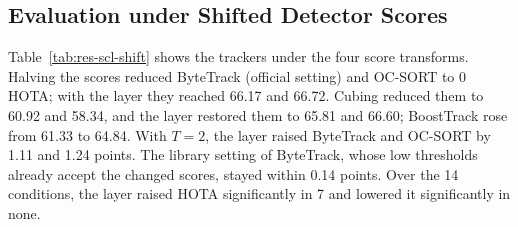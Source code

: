 \subsection{Evaluation under Shifted Detector Scores}\label{sec:res-shift}
Table~\ref{tab:res-scl-shift} shows the trackers under the four score transforms. Halving the scores reduced ByteTrack (official setting) and OC-SORT to 0 HOTA; with the layer they reached 66.17 and 66.72. Cubing reduced them to 60.92 and 58.34, and the layer restored them to 65.81 and 66.60; BoostTrack rose from 61.33 to 64.84. With $T=2$, the layer raised ByteTrack and OC-SORT by 1.11 and 1.24 points. The library setting of ByteTrack, whose low thresholds already accept the changed scores, stayed within 0.14 points. Over the 14 conditions, the layer raised HOTA significantly in 7 and lowered it significantly in none.

